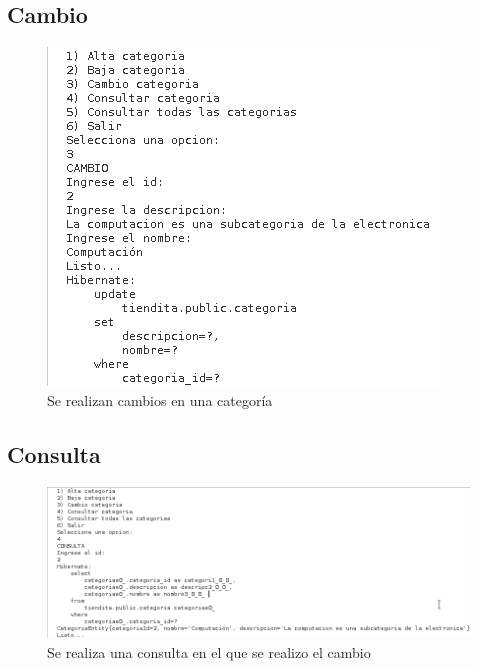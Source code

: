 \documentclass[a4paper,12pt]{article}
\begin{document}
\subsection{Cambio}
\begin{figure}[H]
\begin{center}
 \includegraphics[width=\textwidth]{cambio.png}
 \caption{Se realizan cambios en una categoría}
 \label{fig:cambio}
\end{center}
\end{figure}

\subsection{Consulta}
\begin{figure}[H]
\begin{center}
 \includegraphics[width=\textwidth]{consulta.png}
 \caption{Se realiza una consulta en el que se realizo el cambio}
 \label{fig:consulta}
\end{center}
\end{figure}
\end{document}
